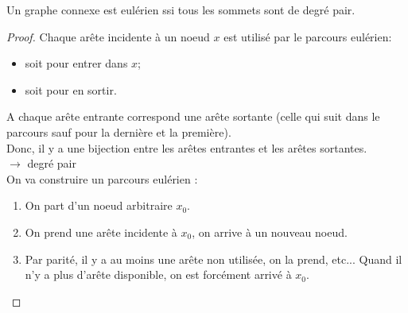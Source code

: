 \begin{mytheo} 
  Un graphe connexe est eulérien ssi tous les sommets sont de degré pair.
  \begin{proof}
    \noindent
    \newline
    \fbox{$\Longrightarrow$}
    \newline
    Chaque arête incidente à un noeud $x$ est utilisé par le parcours eulérien:
    \begin{itemize}
      \item soit pour entrer dans $x$;
      \item soit pour en sortir.
    \end{itemize}
    A chaque arête entrante correspond une arête sortante (celle qui suit dans le parcours sauf pour la dernière et la première).\\
    Donc, il y a une bijection entre les arêtes entrantes et les arêtes sortantes.\\
    $\longrightarrow$ degré pair \\

    \noindent
    \fbox{$\Longleftarrow$}
    \newline
    On va construire un parcours eulérien :
    \begin{enumerate}
      \item On part d'un noeud arbitraire $x_0$.
      \item On prend une arête incidente à $x_0$, on arrive à un nouveau noeud.
      \item Par parité, il y a au moins une arête non utilisée, on la prend, etc... Quand il n'y a plus d'arête disponible, on est forcément arrivé à $x_0$.
    \end{enumerate}
    \begin{center}
\end{center}
\end{proof}
\end{mytheo}
